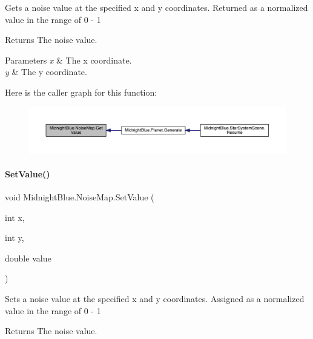 Gets a noise value at the specified x and y coordinates. Returned as a normalized value in the range of 0 -\/ 1 

\begin{DoxyReturn}{Returns}
The noise value.
\end{DoxyReturn}

\begin{DoxyParams}{Parameters}
{\em x} & The x coordinate.\\
\hline
{\em y} & The y coordinate.\\
\hline
\end{DoxyParams}
Here is the caller graph for this function\+:\nopagebreak
\begin{figure}[H]
\begin{center}
\leavevmode
\includegraphics[width=350pt]{class_midnight_blue_1_1_noise_map_a70d9e8d99e157143eb3d1dbc3895cb9a_icgraph}
\end{center}
\end{figure}
\hypertarget{class_midnight_blue_1_1_noise_map_a26d94cbea4c0377833bed064cbd36496}{}\label{class_midnight_blue_1_1_noise_map_a26d94cbea4c0377833bed064cbd36496} 
\paragraph{\texorpdfstring{Set\+Value()}{SetValue()}}
{\footnotesize\ttfamily void Midnight\+Blue.\+Noise\+Map.\+Set\+Value (\begin{DoxyParamCaption}\item[{int}]{x,  }\item[{int}]{y,  }\item[{double}]{value }\end{DoxyParamCaption})\hspace{0.3cm}{\ttfamily [inline]}}



Sets a noise value at the specified x and y coordinates. Assigned as a normalized value in the range of 0 -\/ 1 

\begin{DoxyReturn}{Returns}
The noise value.
\end{DoxyReturn}

